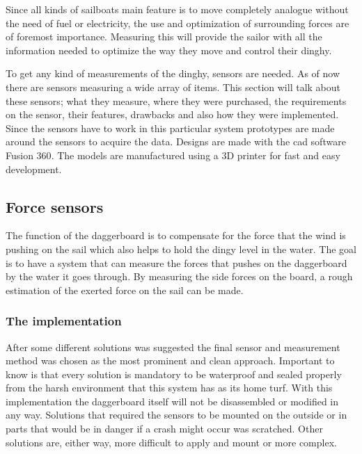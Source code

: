 Since all kinds of sailboats main feature is to move completely analogue without the need of fuel or electricity, the use and optimization of surrounding forces are of foremost importance. Measuring this will provide the sailor with all the information needed to optimize the way they move and control their dinghy.

To get any kind of measurements of the dinghy, sensors are needed. As of now there are sensors measuring a wide array of items. This section will talk about these sensors; what they measure, where they were purchased, the requirements on the sensor, their features, drawbacks and also how they were implemented.
Since the sensors have to work in this particular system prototypes are made around the sensors to acquire the data.
Designs are made with the \gls{cad} software Fusion 360\cite{cad}. The models are manufactured using a 3D printer for fast and easy development.

\subsection{Force sensors}
The function of the daggerboard is to compensate for the force that the wind is pushing on the sail which also helps to hold the dingy level in the water. The goal is to have a system that can measure the forces that pushes on the daggerboard by the water it goes through. By measuring the side forces on the board, a rough estimation of the exerted force on the sail can be made. 


\subsubsection{The implementation}
After some different solutions was suggested the final sensor and measurement method was chosen as the most prominent and clean approach. 
Important to know is that every solution is mandatory to be waterproof and sealed properly from the harsh environment that this system has as its home turf. 
With this implementation the daggerboard itself will not be disassembled or modified in any way. 
Solutions that required the sensors to be mounted on the outside or in parts that would be in danger if a crash might occur was scratched.  
Other solutions are, either way, more difficult to apply and mount or more complex.  


